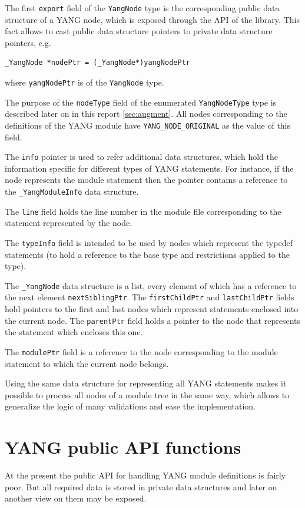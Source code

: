 \documentclass[conference]{IEEEtran}
\begin{document}
The first \texttt{export} field of the \texttt{YangNode} type is the corresponding public data structure of a YANG node, 
which is exposed through the API of the library. This fact allows to cast public data structure pointers to private data structure pointers, e.g.
\small
\begin{verbatim}
_YangNode *nodePtr = (_YangNode*)yangNodePtr
\end{verbatim}
\normalsize
where \texttt{yangNodePtr} is of the \texttt{YangNode} type.

The purpose of the \texttt{nodeType} field of the enumerated \texttt{YangNodeType} type is described later on in this report \ref{sec:augment}. 
All nodes corresponding to the  definitions of the YANG module have \texttt{YANG\_NODE\_ORIGINAL} as the value of this field.

The \texttt{info} pointer is used to  refer additional data structures, which hold the information specific for different types of YANG statements. 
For instance, if the node represents the module statement then the pointer contains a reference to the \texttt{\_YangModuleInfo} data structure.

The \texttt{line} field holds the line number in the module file corresponding to the statement represented by the node.

The \texttt{typeInfo} field is intended to be used by nodes which represent the typedef statements (to hold a reference to the base type and restrictions applied to the type). 

The \texttt{\_YangNode} data structure is a list, every element of which has a reference to the next element \texttt{nextSiblingPtr}. 
The \texttt{firstChildPtr}  and \texttt{lastChildPtr} fields hold pointers to the first and last nodes which represent statements enclosed into the current node.
The \texttt{parentPtr}  field holds a pointer to the node that represents the statement which encloses this one.

The \texttt{modulePtr}  field is a reference to the node corresponding to the module statement to which  the current node belongs.

Using the same data structure for representing all YANG statements makes it possible to process all nodes of a module tree in the same way, 
which allows to generalize the logic of many validations and ease the implementation.

\section{YANG public API functions}
At the present the public API for handling YANG module definitions is fairly poor. 
But all required data is stored in private data structures and later on another view on them may be exposed.
\end{document}
